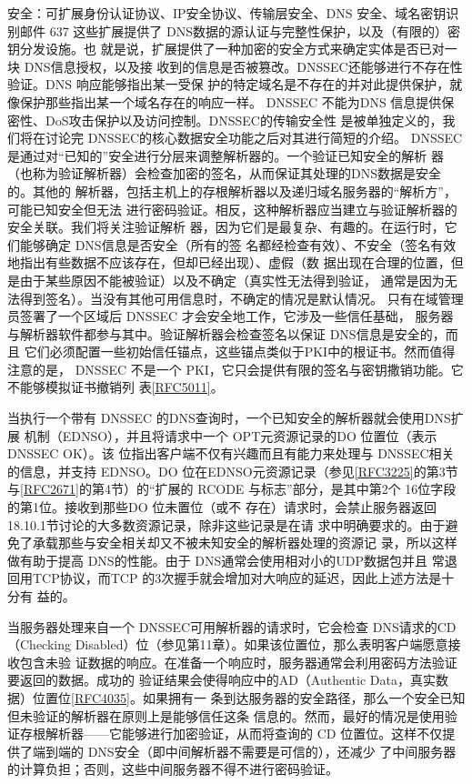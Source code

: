 安全：可扩展身份认证协议、IP安全协议、传输层安全、DNS 安全、域名密钥识别邮件 637
这些扩展提供了 DNS数据的源认证与完整性保护，以及（有限的）密钥分发设施。也
就是说，扩展提供了一种加密的安全方式来确定实体是否已对一块 DNS信息授权，以及接
收到的信息是否被篡改。DNSSEC还能够进行不存在性验证。DNS 响应能够指出某一受保
护的特定域名是不存在的并对此提供保护，就像保护那些指出某一个域名存在的响应一样。
DNSSEC 不能为DNS 信息提供保密性、DoS攻击保护以及访问控制。DNSSEC的传输安全性
是被单独定义的，我们将在讨论完 DNSSEC的核心数据安全功能之后对其进行简短的介绍。
DNSSEC是通过对“已知的”安全进行分层来调整解析器的。一个验证已知安全的解析
器（也称为验证解析器）会检查加密的签名，从而保证其处理的DNS数据是安全的。其他的
解析器，包括主机上的存根解析器以及递归域名服务器的“解析方”，可能已知安全但无法
进行密码验证。相反，这种解析器应当建立与验证解析器的安全关联。我们将关注验证解析
器，因为它们是最复杂、有趣的。在运行时，它们能够确定 DNS信息是否安全（所有的签
名都经检查有效）、不安全（签名有效地指出有些数据不应该存在，但却已经出现）、虚假（数
据出现在合理的位置，但是由于某些原因不能被验证）以及不确定（真实性无法得到验证，
通常是因为无法得到签名）。当没有其他可用信息时，不确定的情况是默认情况。
只有在域管理员签署了一个区域后 DNSSEC 才会安全地工作，它涉及一些信任基础，
服务器与解析器软件都参与其中。验证解析器会检查签名以保证 DNS信息是安全的，而且
它们必须配置一些初始信任锚点，这些锚点类似于PKI中的根证书。然而值得注意的是，
DNSSEC 不是一个 PKI，它只会提供有限的签名与密钥撒销功能。它不能够模拟证书撤销列
表\href{https://www.rfc-editor.org/rfc/rfc5011}{[RFC5011]}。

当执行一个带有 DNSSEC 的DNS查询时，一个已知安全的解析器就会使用DNS扩展
机制（EDNSO），并且将请求中一个 OPT元资源记录的DO 位置位（表示 DNSSEC OK）。该
位指出客户端不仅有兴趣而且有能力来处理与 DNSSEC相关的信息，并支持 EDNSO。DO
位在EDNSO元资源记录（参见\href{https://www.rfc-editor.org/rfc/rfc3225}{[RFC3225]}的第3节与\href{https://www.rfc-editor.org/rfc/rfc2671}{[RFC2671]}的第4节）的“扩展的
RCODE 与标志”部分，是其中第2个 16位字段的第1位。接收到那些DO 位未置位（或不
存在）请求时，会禁止服务器返回18.10.1节讨论的大多数资源记录，除非这些记录是在请
求中明确要求的。由于避免了承载那些与安全相关却又不被未知安全的解析器处理的资源记
录，所以这样做有助于提高 DNS的性能。由于 DNS通常会使用相对小的UDP数据包并且
常退回用TCP协议，而TCP 的3次握手就会增加对大响应的延迟，因此上述方法是十分有
益的。

当服务器处理来自一个 DNSSEC可用解析器的请求时，它会检查 DNS请求的CD
（Checking Disabled）位（参见第11章）。如果该位置位，那么表明客户端愿意接收包含未验
证数据的响应。在准备一个响应时，服务器通常会利用密码方法验证要返回的数据。成功的
验证结果会使得响应中的AD（Authentic Data，真实数据）位置位\href{https://www.rfc-editor.org/rfc/rfc4035}{[RFC4035]}。如果拥有一
条到达服务器的安全路径，那么一个安全已知但未验证的解析器在原则上是能够信任这条
信息的。然而，最好的情况是使用验证存根解析器——它能够进行加密验证，从而将查询的
CD 位置位。这样不仅提供了端到端的 DNS安全（即中间解析器不需要是可信的），还减少
了中间服务器的计算负担；否则，这些中间服务器不得不进行密码验证。

